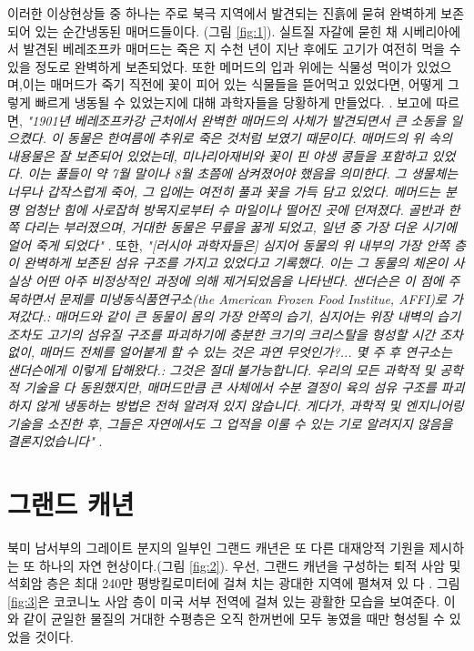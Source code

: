 \documentclass[10pt,twocolumn,letterpaper]{article}
\begin{document}
이러한 이상현상들 중 하나는 주로 북극 지역에서 발견되는 진흙에 묻혀 완벽하게 보존되어 있는 순간냉동된 매머드들이다. (그림 \ref{fig:1}). 실트질 자갈에 묻힌 채 시베리아에서 발견된 베레조프카 매머드는 죽은 지 수천 년이 지난 후에도 고기가 여전히 먹을 수 있을 정도로 완벽하게 보존되었다. 또한   메머드의 입과 위에는 식물성 먹이가 있었으며,이는 매머드가 죽기 직전에 꽃이 피어 있는 식물들을 뜯어먹고 있었다면, 어떻게 그렇게 빠르게 냉동될 수 있었는지에 대해 과학자들을 당황하게 만들었다. \cite{17}. 보고에 따르면, \textit{"1901년 베레조프카강 근처에서 완벽한 매머드의 사체가 발견되면서 큰 소동을 일으켰다. 이 동물은 한여름에 추위로  죽은 것처럼 보였기 때문이다. 매머드의 위 속의 내용물은 잘 보존되어 있었는데, 미나리아재비와 꽃이 핀 야생 콩들을 포함하고 있었다. 이는 풀들이 약 7월 말이나 8월 초쯤에 삼켜졌어야 했음을 의미한다. 그 생물체는 너무나 갑작스럽게 죽어, 그 입에는 여전히 풀과 꽃을 가득 담고 있었다. 메머드는 분명 엄청난 힘에 사로잡혀 방목지로부터 수 마일이나 떨어진 곳에 던져졌다. 골반과 한쪽 다리는 부러졌으며, 거대한 동물은 무릎을 꿇게 되었고, 일년 중  가장 더운 시기에 얼어 죽게 되었다"} \cite{18}. 또한, \textit{"[러시아 과학자들은] 심지어 동물의 위 내부의 가장 안쪽 층이 완벽하게 보존된 섬유 구조를 가지고 있었다고 기록했다. 이는 그 동물의 체온이 사실상  어떤 아주 비정상적인  과정에 의해 제거되었음을 나타낸다. 샌더슨은 이 점에 주목하면서 문제를 미냉동식품연구소(the American Frozen Food Institue, AFFI)로 가져갔다.: 매머드와 같이 큰 동물이 몸의 가장 안쪽의 습기,  심지어는 위장 내벽의 습기 조차도  고기의 섬유질 구조를 파괴하기에 충분한 크기의 크리스탈을 형성할 시간 조차 없이, 매머드 전체를 얼어붙게 할 수 있는 것은 과연 무엇인가?... 몇 주 후 연구소는 샌더슨에게 이렇게 답해왔다.: 그것은 절대 불가능합니다. 우리의 모든 과학적 및 공학적 기술을 다 동원했지만, 매머드만큼 큰 사체에서 수분 결정이 육의 섬유 구조를 파괴하지 않게 냉동하는 방법은 전혀 알려져 있지 않습니다. 게다가, 과학적 및 엔지니어링 기술을 소진한 후, 그들은 자연에서도 그 업적을 이룰 수 있는 기로 알려지지 않음을 결론지었습니다"} \cite{19}.

\section{그랜드 캐년}

북미 남서부의 그레이트 분지의 일부인 그랜드 캐년은 또 다른 대재앙적 기원을 제시하는 또 하나의 자연 현상이다.(그림 \ref{fig:2}). 우선, 그랜드 캐년을 구성하는 퇴적 사암 및 석회암 층은 최대 240만 평방킬로미터에 걸쳐
치는 광대한 지역에 펼쳐져 있 다 \cite{21}. 그림 \ref{fig:3}은 코코니노 사암 층이 미국 서부 전역에 걸쳐 있는 광활한 모습을 보여준다. 이와 같이 균일한 물질의 거대한 수평층은 오직 한꺼번에  모두 놓였을 때만 형성될 수 있었을 것이다.
\end{document}
